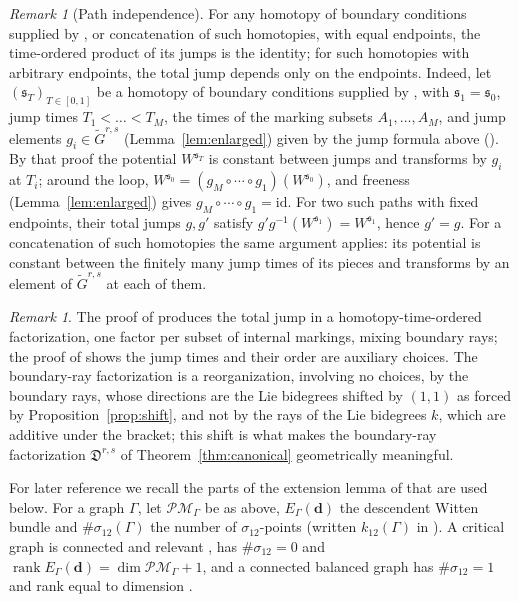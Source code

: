 \documentclass[11pt]{amsart}
\theoremstyle{definition}
\theoremstyle{remark}
\newtheorem{remark}[theorem]{Remark}
\newcommand{\Dscr}{\mathfrak{D}}
\begin{document}
\begin{remark}[Path independence]
\label{rem:pathindep}
For any homotopy of boundary conditions supplied by \cite[Lem.~3.40]{GKT},
or concatenation of such homotopies, with equal endpoints, the time-ordered
product of its jumps is the identity;
for such homotopies with arbitrary endpoints, the total jump depends only on
the endpoints.  Indeed, let $(\mathfrak s_{T})_{T\in[0,1]}$ be a homotopy of boundary conditions
supplied by \cite[Lem.~3.40]{GKT}, with $\mathfrak s_{1}=\mathfrak s_{0}$, jump times
$T_{1}<\dots<T_{M}$, the times of the marking subsets $A_1,\dots,A_M$, and
jump elements $g_{i}\in\widetilde G^{r,s}$ (Lemma~\ref{lem:enlarged}) given by
the jump formula above
(\cite[proof of Thm.~5.9, eqns.~(5.33)--(5.37)]{GKT}). By that proof the potential
$W^{\mathfrak s_{T}}$ is constant between jumps and transforms by $g_{i}$ at $T_{i}$;
around the loop, $W^{\mathfrak s_{0}}=(g_{M}\circ\cdots\circ g_{1})(W^{\mathfrak s_{0}})$, and
freeness (Lemma~\ref{lem:enlarged}) gives $g_{M}\circ\cdots\circ
g_{1}=\mathrm{id}$. For two such paths with fixed endpoints, their total jumps
$g,g'$ satisfy $g'g^{-1}(W^{\mathfrak s_{1}})=W^{\mathfrak s_{1}}$, hence $g'=g$.
For a concatenation of such homotopies the same argument applies: its
potential is constant between the finitely many jump times of its pieces and
transforms by an element of $\widetilde G^{r,s}$ at each of them.
\end{remark}

\begin{remark}
\label{rem:timeorder}
The proof of \cite[Thm.~5.9]{GKT} produces the total jump in a homotopy-time-ordered factorization, one factor per subset of internal markings, mixing boundary rays;
the proof of \cite[Lem.~3.40]{GKT} shows the jump times and their order are auxiliary
choices. The boundary-ray factorization is a reorganization, involving no
choices, by the boundary rays, whose directions are the Lie bidegrees
shifted by $(1,1)$ as forced by Proposition~\ref{prop:shift}, and not by the
rays of the Lie bidegrees $k$, which are additive under the bracket; this
shift is what makes the boundary-ray factorization $\Dscr^{r,s}$ of
Theorem~\ref{thm:canonical} geometrically meaningful.
\end{remark}

For later reference we recall the parts of the extension lemma of \cite{GKT}
that are used below.  For a graph $\Gamma$, let $\mathcal{PM}_\Gamma$ be as
above, $E_\Gamma(\mathbf d)$ the descendent Witten bundle and $\#\sigma_{12}(\Gamma)$
the number of $\sigma_{12}$-points (written $k_{12}(\Gamma)$ in \cite{GKT}).  A critical graph is connected and
relevant \cite[Def.~1.57]{GKT}, has $\#\sigma_{12}=0$ and $\operatorname{rank}E_\Gamma(\mathbf d)=\dim\mathcal{PM}_\Gamma+1$,
and a connected balanced graph has $\#\sigma_{12}=1$ and rank equal to dimension
\cite[Defs.~2.32--2.33]{GKT}.
\end{document}
